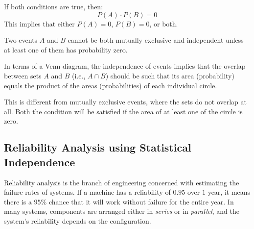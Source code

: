 \documentclass[twoside]{book}
\begin{document}
If both conditions are true, then:
\[
P(A) \cdot P(B) = 0
\]
This implies that either \( P(A) = 0 \), \( P(B) = 0 \), or both.

\begin{textbox}
Two events \( A \) and \( B \) cannot be both mutually exclusive and independent unless at least one of them has probability zero.
\end{textbox}


In terms of a Venn diagram, the independence of events implies that the overlap between sets \( A \) and \( B \) (i.e., \( A \cap B \)) should be such that its area (probability) equals the product of the areas (probabilities) of each individual circle. 

\begin{center}
\end{center}

This is different from mutually exclusive events, where the sets do not overlap at all. Both the condition will be satisfied if the area of at least one of the circle is zero.

\subsection{Reliability Analysis using Statistical Independence}

Reliability analysis is the branch of engineering concerned with estimating the failure
rates of systems. If a machine has a reliability of $0.95$ over $1$ year, it means there is a $95\%$ chance that it will work without failure for the entire year. In many systems, components are arranged either in \textit{series} or in \textit{parallel}, and the system's reliability depends on the configuration.
\end{document}
